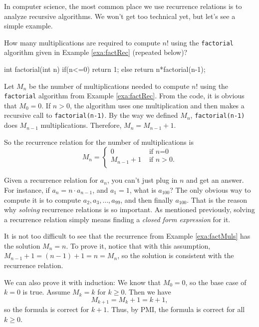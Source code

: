 In computer science, the most common place we use recurrence relations is to analyze recursive algorithms.
We won't get too technical yet, but let's see a simple example.

\begin{exa}\label{exa:factMuls}
How many multiplications are required to compute $n!$ using the \verb+factorial+ algorithm given
in Example \ref{exa:factRec} (repeated below)?
\begin{code}
    int factorial(int n) {
        if(n<=0) {
            return 1;
        } else {
            return n*factorial(n-1);
        }
    }
\end{code} 
\begin{sol}
Let $M_n$ be the number of multiplications needed to compute $n!$ using 
the \verb+factorial+ algorithm from Example \ref{exa:factRec}.
From the code, it is obvious that $M_0=0$.  If $n>0$, 
the algorithm uses one multiplication and then makes a recursive call to \verb+factorial(n-1)+.
By the way we defined $M_n$, \verb+factorial(n-1)+ does $M_{n-1}$ multiplications.
Therefore, $M_n=M_{n-1}+1$.  

So the recurrence relation for the number of multiplications is 
$$M_n=\left\{
\begin{array}{ll}
0&\mbox{ if $n$=0}\\
M_{n-1}+1&\mbox{ if }n>0.\\
\end{array}
\right.
$$
\end{sol}
\end{exa}

Given a recurrence relation for $a_n$, you can't just plug in $n$ and get an answer.  For instance, 
if $a_n=n\cdot a_{n-1}$, and $a_1=1$, what is $a_{100}$?  The only obvious way to compute it is
to compute $a_2, a_3,\ldots, a_{99}$, and then finally $a_{100}$.  That is the reason why
{\em solving} recurrence relations is so important.  As mentioned previously, solving a recurrence
relation simply means finding a {\em closed form expression} for it.

\begin{exa}
It is not too difficult to see that the recurrence from Example \ref{exa:factMuls} has the
solution $M_n=n$.  To prove it, notice that with this assumption, $M_{n-1}+1= (n-1)+1 = n=M_{n}$,
so the solution is consistent with the recurrence relation.

We can also prove it with induction: 
We know that $M_0=0$, so the base case of $k=0$ is true.
Assume $M_k=k$ for $k\ge 0$.  Then we have
$$M_{k+1} = M_{k} + 1 = k + 1,$$
so the formula is correct for $k+1$.  Thus, by PMI, the formula is correct for all $k\geq 0$.
\end{exa}

